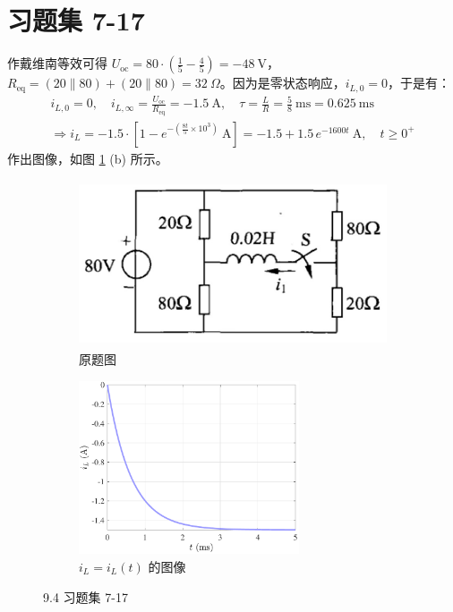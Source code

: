 \documentclass[UTF8]{report}
\theoremstyle{MyLineTheoremStyle} %
\theoremstyle{MyBlockTheoremStyle} %
\theoremstyle{MySubsubsectionStyle} %
\begin{document}
\section{习题集 7-17}
作戴维南等效可得 $U_{\text{oc}} = 80 \cdot \left(\frac{1}{5} - \frac{4}{5}\right) = -48 \ \mathrm{V}$，$R_{\text{eq}} = (20 \parallel 80) + (20 \parallel 80) = 32 \ \Omega$。因为是零状态响应，$i_{L,0} = 0$，于是有：
\begin{gather}
    i_{L,0} = 0,\quad i_{L,\infty} = \frac{U_{\text{oc}}}{R_{\text{eq}}} = -1.5 \ \mathrm{A},\quad \tau = \frac{L}{R} = \frac{5}{8} \ \mathrm{ms} =  0.625 \ \mathrm{ms} \\ 
    \Longrightarrow 
    \boxed{
        i_L = -1.5\cdot \left[1 - e^{- \left( \frac{8t}{5}\times 10^3\right)} \ \mathrm{A}\right] =  -1.5  + 1.5\,e^{- 1600 t} \ \mathrm{A},\quad t \geqslant 0^+
    }
\end{gather}
作出图像，如图 \ref{9.4 习题集 7-17} (b) 所示。
\begin{figure}[H]\centering
    \begin{subfigure}[b]{0.5\columnwidth}\centering
        \includegraphics[height=140pt]{assets/9/9.4 a.png}
        \caption{原题图}
    \end{subfigure}\hfill
    \begin{subfigure}[b]{0.5\columnwidth}\centering
        \includegraphics[height=145pt]{assets/9/9.4 b.pdf}
        \caption{$i_L = i_L(t)$ 的图像}
    \end{subfigure}
    \caption{9.4 习题集 7-17}
    \label{9.4 习题集 7-17}
\end{figure}
\end{document}
